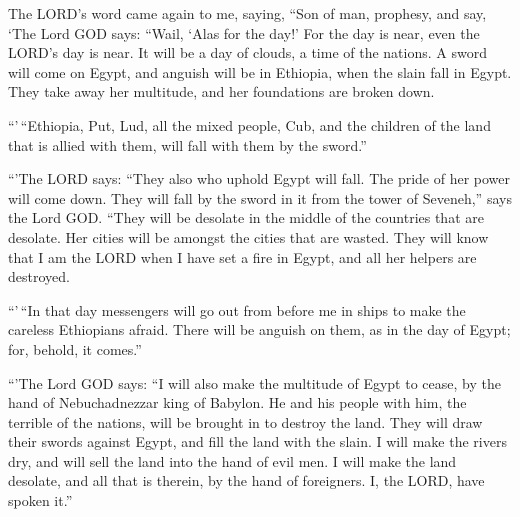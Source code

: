  The LORD's word came again to me, saying, 
``Son of man, prophesy, and say, `The Lord GOD says: ``Wail, `Alas for
the day!'  For the day is near, even the LORD's day is
near. It will be a day of clouds, a time of the nations. 
A sword will come on Egypt, and anguish will be in Ethiopia, when the
slain fall in Egypt. They take away her multitude, and her foundations
are broken down.

 ``'\,``Ethiopia, Put, Lud, all the mixed people, Cub, and
the children of the land that is allied with them, will fall with them
by the sword.''

 ``'The LORD says: ``They also who uphold Egypt will fall.
The pride of her power will come down. They will fall by the sword in it
from the tower of Seveneh,'' says the Lord GOD.  ``They
will be desolate in the middle of the countries that are desolate. Her
cities will be amongst the cities that are wasted.  They
will know that I am the LORD when I have set a fire in Egypt, and all
her helpers are destroyed.

 ``'\,``In that day messengers will go out from before me
in ships to make the careless Ethiopians afraid. There will be anguish
on them, as in the day of Egypt; for, behold, it comes.''

 ``'The Lord GOD says: ``I will also make the multitude
of Egypt to cease, by the hand of Nebuchadnezzar king of Babylon.
 He and his people with him, the terrible of the nations,
will be brought in to destroy the land. They will draw their swords
against Egypt, and fill the land with the slain.  I will
make the rivers dry, and will sell the land into the hand of evil men. I
will make the land desolate, and all that is therein, by the hand of
foreigners. I, the LORD, have spoken it.''

